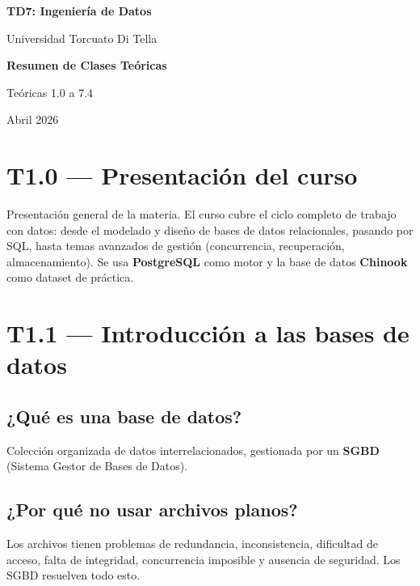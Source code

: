 \documentclass[12pt, a4paper]{article}
\begin{document}
\begin{titlepage}
  \centering
  \vspace*{3cm}
  {\Huge\bfseries\color{teal} TD7: Ingeniería de Datos\par}
  \vspace{0.5cm}
  {\Large Universidad Torcuato Di Tella\par}
  \vspace{2cm}
  {\huge\bfseries Resumen de Clases Teóricas\par}
  \vspace{1cm}
  {\large Teóricas 1.0 a 7.4\par}
  \vfill
  {\normalsize Abril 2026}
\end{titlepage}

\tableofcontents
\newpage

\section{T1.0 — Presentación del curso}

Presentación general de la materia. El curso cubre el ciclo completo de trabajo con datos: desde el modelado y diseño de bases de datos relacionales, pasando por SQL, hasta temas avanzados de gestión (concurrencia, recuperación, almacenamiento). Se usa \textbf{PostgreSQL} como motor y la base de datos \textbf{Chinook} como dataset de práctica.

\section{T1.1 — Introducción a las bases de datos}

\subsection{¿Qué es una base de datos?}
Colección organizada de datos interrelacionados, gestionada por un \textbf{SGBD} (Sistema Gestor de Bases de Datos).

\subsection{¿Por qué no usar archivos planos?}
Los archivos tienen problemas de redundancia, inconsistencia, dificultad de acceso, falta de integridad, concurrencia imposible y ausencia de seguridad. Los SGBD resuelven todo esto.
\end{document}
